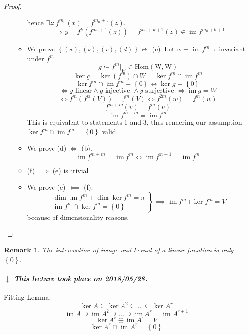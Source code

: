 \documentclass{article}
\newcounter{lecref}[section]
\numberwithin{lecref}{section}
\newtheorem{remark}[lecref]{Remark}
\newcommand{\set}[1]{\left\{#1\right\}}
\newcommand{\dateref}[1]{%
  \begin{mdframed}[backgroundcolor=gray!10,innerbottommargin=0pt,innertopmargin=0pt]
    \paragraph{\textit{$\downarrow$ This lecture took place on #1.}}%
  \end{mdframed}%
}
\DeclareMathOperator{\im}{im}
\begin{document}
\begin{proof}
\begin{enumerate}
\begin{itemize}
          hence $\exists z: f^{m_0}(x) = f^{m_0 + 1}(z)$.
          \[ \implies y = f^k(f^{m_0 + 1}(z)) = f^{m_0 + k + 1}(z) \in \im{f^{m_0 + k + 1}} \]
        \item We prove $\set{(a), (b), (c), (d)} \iff$ (e).
          Let $w = \im{f^m}$ is invariant under $f^m$.
          \[ g \coloneqq f^m|_W \in \operatorname{Hom(W, W)} \]
          \[ \ker{g} = \ker(f^m) \cap W = \ker{f^m} \cap \im{f^m} \]
          \[ \ker{f^m} \cap \im{f^m} = \set{0} \iff \ker{g} = \set{0} \]
          \[ \iff g \text{ linear} \land g \text{ injective } \land g \text{ surjective } \iff \im{g} = W \]
          \[ \iff f^m(f^m(V)) = f^m(V) \iff f^{2m}(w) = f^m(w) \]
          \[ f^{m+m}(v) = f^m(v) \]
          \[ \im{f^{m+m}} = \im{f^m} \]
          This is equivalent to statements 1 and 3, thus rendering our assumption $\ker{f^m} \cap \im{f^m} = \set{0}$ valid.
        \item We prove (d) $\iff$ (b).
          \[ \im{f^{m+m}} = \im{f^m} \iff \im{f^{m+1}} = \im{f^m} \]
        \item (f) $\implies$ (e) is trivial.
        \item We prove (e) $\impliedby$ (f).
          \[
            \left.\begin{array}{c}
              \dim\im{f^m} + \dim\ker{f^m} = n \\
              \im{f^m} \cap \ker{f^m} = \set{0}
            \end{array}\right\}
            \implies \im{f^m} \dot{+} \ker{f^m} = V
          \]
          because of dimensionality reasons.
      \end{itemize}
  \end{enumerate}
\end{proof}

\begin{remark}
  The intersection of image and kernel of a linear function is only $\set{0}$.
\end{remark}

\dateref{2018/05/28}

Fitting Lemma:
\[ \ker{A} \subseteq \ker{A^2} \subseteq \dots \subseteq \ker{A^r} \]
\[ \im{A} \supseteq \im{A^2} \supseteq \dots \supseteq \im{A^r} = \im{A^{r+1}} \]
\[ \ker{A^r} \oplus \im{A^r} = V \]
\[ \ker{A^r} \cap \im{A^r} = \set{0} \]
\end{document}
